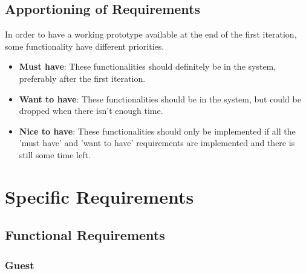 \documentclass[a4paper, 12pt]{report}
\begin{document}
\section{Apportioning of Requirements}
	In order to have a working prototype available at the end of the
	first iteration, some functionality have different priorities.
	\begin{itemize}
		\item \textbf{Must have}: These functionalities should definitely 
		be in the system, preferably after the first iteration.
		\item \textbf{Want to have}: These functionalities should be in 
		the system, but could be dropped when there isn't enough time.
		\item \textbf{Nice to have}: These functionalities should only be 
		implemented if all the 'must have' and 'want to have' 
		requirements are implemented and there is still some time left.
	\end{itemize}

\chapter{Specific Requirements}

\section{Functional Requirements} %
	\subsection{Guest}
\end{document}
